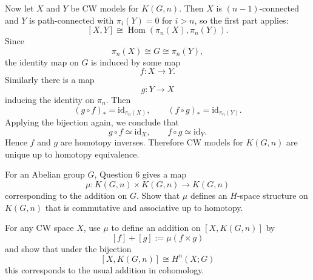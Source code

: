 \documentclass[12pt]{article}
\begin{document}
\begin{solution}
\medskip

Now let \(X\) and \(Y\) be CW models for \(K(G,n)\). Then \(X\) is \((n-1)\)-connected and \(Y\) is path-connected with \(\pi_i(Y)=0\) for \(i>n\), so the first part applies:
\[
[X,Y]\cong \operatorname{Hom}(\pi_n(X),\pi_n(Y)).
\]
Since
\[
\pi_n(X)\cong G\cong \pi_n(Y),
\]
the identity map on \(G\) is induced by some map
\[
f:X\to Y.
\]
Similarly there is a map
\[
g:Y\to X
\]
inducing the identity on \(\pi_n\). Then
\[
(g\circ f)_*=\mathrm{id}_{\pi_n(X)},
\qquad
(f\circ g)_*=\mathrm{id}_{\pi_n(Y)}.
\]
Applying the bijection again, we conclude that
\[
g\circ f\simeq \mathrm{id}_X,
\qquad
f\circ g\simeq \mathrm{id}_Y.
\]
Hence \(f\) and \(g\) are homotopy inverses. Therefore CW models for \(K(G,n)\) are unique up to homotopy equivalence.
\end{solution}

\begin{problem}
For an Abelian group \(G\), Question 6 gives a map
\[
\mu:K(G,n)\times K(G,n)\to K(G,n)
\]
corresponding to the addition on \(G\). Show that \(\mu\) defines an \(H\)-space structure on \(K(G,n)\) that is commutative and associative up to homotopy.

For any CW space \(X\), use \(\mu\) to define an addition on \([X,K(G,n)]\) by
\[
[f]+[g]:=\mu(f\times g)
\]
and show that under the bijection
\[
[X,K(G,n)]\cong H^n(X;G)
\]
this corresponds to the usual addition in cohomology.
\end{problem}
\end{document}
